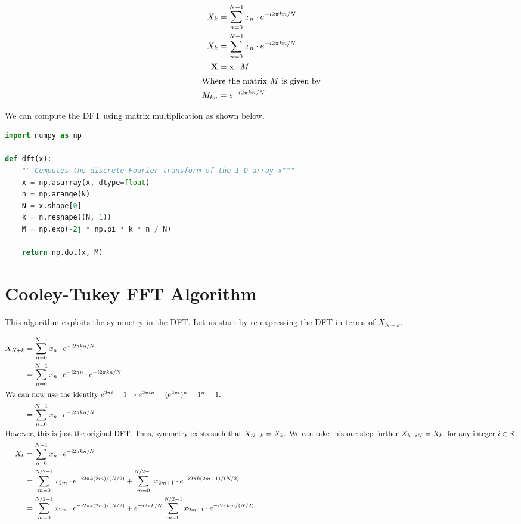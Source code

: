 \documentclass{article}
\begin{document}
\begin{align*}
    X_k &= \sum_{n=0}^{N-1} x_n \cdot e^{-i 2 \pi k n / N}\\
    X_k &= \sum_{n=0}^{N-1} x_n \cdot e^{-i 2 \pi k n / N}\\
    \textbf{X} &= \textbf{x} \cdot M\\
    \intertext{Where the matrix $M$ is given by}
    M_{kn} &= e^{-i 2 \pi k n / N}
\end{align*}

\newpage
\thispagestyle{fancy}
We can compute the DFT using matrix multiplication as shown below.
\begin{lstlisting}[language=Python, caption=Na\"{i}ve implementation of the DFT]
import numpy as np

def dft(x):
    """Computes the discrete Fourier transform of the 1-D array x"""
    x = np.asarray(x, dtype=float)
    n = np.arange(N)
    N = x.shape[0]
    k = n.reshape((N, 1))
    M = np.exp(-2j * np.pi * k * n / N)

    return np.dot(x, M)
\end{lstlisting}


\section*{Cooley-Tukey FFT Algorithm}
This algorithm exploits the symmetry in the DFT. Let us start by re-expressing the DFT in terms of $X_{N+k}$.\vspace{-1em}

\begin{align*}
    X_{N+k} &= \sum_{n=0}^{N-1} x_n \cdot e^{-i 2 \pi k n / N}\\
    &= \sum_{n=0}^{N-1} x_n \cdot e^{-i 2\pi n} \cdot e^{-i 2\pi k n / N}\\
    \intertext{We can now use the identity $e^{ 2\pi i} = 1 \Rightarrow e^{2\pi i n} = (e^{2\pi i})^n = 1^n = 1$.}
    &= \sum_{n=0}^{N-1} x_n \cdot e^{-i 2\pi k n / N}\\
    \intertext{However, this is just the original DFT. Thus, symmetry exists such that $X_{N+k} = X_k$. We can take this one step further $X_{k + iN} = X_k$, for any integer $i \in \mathbb{R}$.}
    X_k &= \sum_{n=0}^{N-1} x_n \cdot e^{-i 2\pi k n/N}\\
    &= \sum_{m=0}^{N/2 - 1} x_{2m} \cdot e^{-i2\pi k(2m)/(N/2)} + \sum_{m=0}^{N/2 - 1} x_{2m + 1} \cdot e^{-i2\pi k(2m + 1)/ (N/2)}\\
    &= \sum_{m=0}^{N/2 - 1} x_{2m} \cdot e^{-i2\pi k(2m)/(N/2)} + e^{-i 2\pi k/N} \sum_{m=0}^{N/2 - 1} x_{2m + 1} \cdot e^{-i2\pi k  m/ (N/2)}\\
\end{align*}
\end{document}
